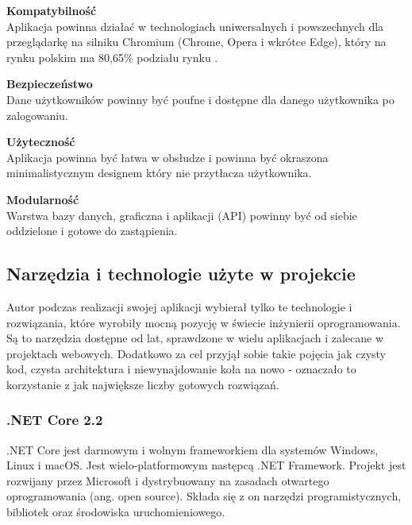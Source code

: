 \documentclass[12pt]{article}
\numberwithin{figure}{section}
\begin{document}
        \noindent
        \textbf{Kompatybilność}\\
        \indent
        Aplikacja powinna działać w technologiach uniwersalnych i powszechnych dla przeglądarkę na silniku Chromium (Chrome, Opera i wkrótce Edge), który na rynku polskim ma 80,65\% podziału rynku \cite{chrome}.
        
        \noindent
        \textbf{Bezpieczeństwo}\\
        \indent
        Dane użytkowników powinny być poufne i dostępne dla danego użytkownika po zalogowaniu.
        
        \noindent
        \textbf{Użyteczność }\\
        \indent
        Aplikacja powinna być łatwa w obsłudze i powinna być okraszona minimalistycznym designem który nie przytłacza użytkownika.
        
        \noindent
        \textbf{Modularność}\\
        Warstwa bazy danych, graficzna i aplikacji (API) powinny być od siebie oddzielone i gotowe do zastąpienia.
    
\subsection{Narzędzia i technologie użyte w projekcie}
Autor podczas realizacji swojej aplikacji wybierał tylko te technologie i rozwiązania, które wyrobiły mocną pozycję w świecie inżynierii oprogramowania. Są to narzędzia dostępne od lat, sprawdzone w wielu aplikacjach i zalecane w projektach webowych. Dodatkowo za cel przyjął sobie takie pojęcia jak czysty kod, czysta architektura i niewynajdowanie koła na nowo - oznaczało to korzystanie z jak największe liczby gotowych rozwiązań.

\subsubsection{.NET Core 2.2}
.NET Core jest darmowym i wolnym frameworkiem dla systemów Windows, Linux i macOS. Jest wielo-platformowym następcą .NET Framework. Projekt jest rozwijany przez Microsoft i dystrybuowany na zasadach otwartego oprogramowania (ang. open source). Składa się z on narzędzi programistycznych, bibliotek oraz środowiska uruchomieniowego.
    
\end{document}
